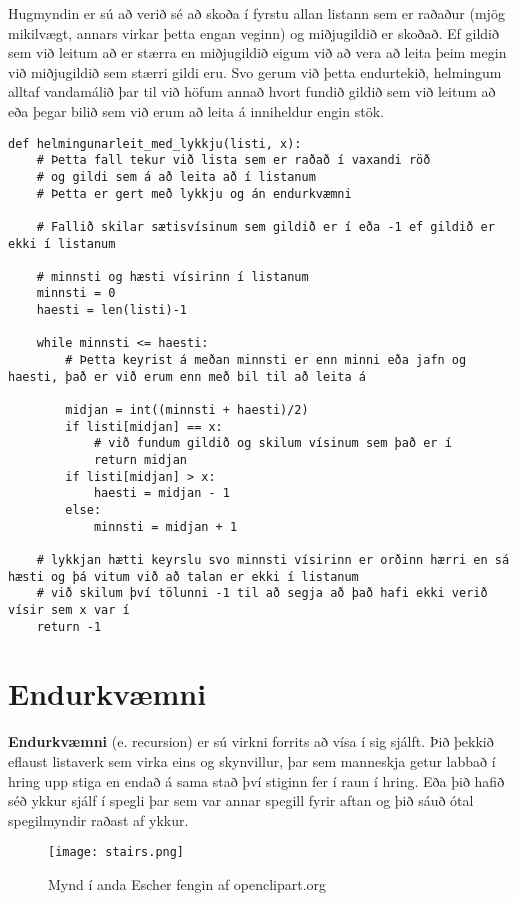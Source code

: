 Hugmyndin er sú að verið sé að skoða í fyrstu allan listann sem er raðaður (mjög mikilvægt, annars virkar þetta engan veginn) og miðjugildið er skoðað.
Ef gildið sem við leitum að er stærra en miðjugildið eigum við að vera að leita þeim megin við miðjugildið sem stærri gildi eru.
Svo gerum við þetta endurtekið, helmingum alltaf vandamálið þar til við höfum annað hvort fundið gildið sem við leitum að eða þegar bilið sem við erum að leita á inniheldur engin stök.


\begin{lstlisting}[caption=Helmingunarleit að tölu í röðuðum lista með lykkju, label=lst:reiknirit-helm-for]
	def helmingunarleit_med_lykkju(listi, x):
	# Þetta fall tekur við lista sem er raðað í vaxandi röð
	# og gildi sem á að leita að í listanum
	# Þetta er gert með lykkju og án endurkvæmni
	
	# Fallið skilar sætisvísinum sem gildið er í eða -1 ef gildið er ekki í listanum
	
	# minnsti og hæsti vísirinn í listanum
	minnsti = 0
	haesti = len(listi)-1
	
	while minnsti <= haesti:
		# Þetta keyrist á meðan minnsti er enn minni eða jafn og haesti, það er við erum enn með bil til að leita á
	
		midjan = int((minnsti + haesti)/2)
		if listi[midjan] == x:
			# við fundum gildið og skilum vísinum sem það er í
			return midjan
		if listi[midjan] > x:
			haesti = midjan - 1
		else:
			minnsti = midjan + 1
	
	# lykkjan hætti keyrslu svo minnsti vísirinn er orðinn hærri en sá hæsti og þá vitum við að talan er ekki í listanum 
	# við skilum því tölunni -1 til að segja að það hafi ekki verið vísir sem x var í
	return -1
\end{lstlisting}

\section{Endurkvæmni}\label{uk:reiknirit-endurkvæmni}
\textbf{Endurkvæmni} (e. recursion) er sú virkni forrits að vísa í sig sjálft.
Þið þekkið eflaust listaverk sem virka eins og skynvillur, þar sem manneskja getur labbað í hring upp stiga en endað á sama stað því stiginn fer í raun í hring. 
Eða þið hafið séð ykkur sjálf í spegli þar sem var annar spegill fyrir aftan og þið sáuð ótal spegilmyndir raðast af ykkur.
\begin{figure}[h]
	\centering
	\texttt{[image: stairs.png]}
	\caption{Mynd í anda Escher fengin af openclipart.org}
	\label{fig: Escher}
\end{figure}

